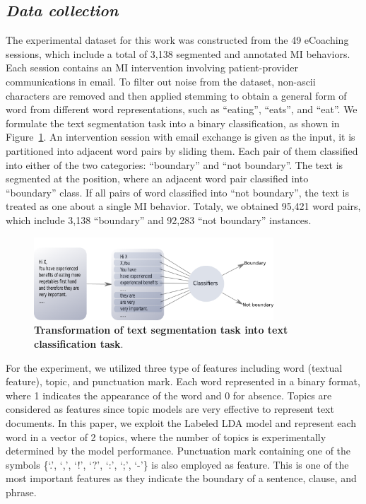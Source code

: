 \documentclass{amia}
\begin{document}
\subsection*{\textit{Data collection}}
The experimental dataset for this work was constructed from the 49 eCoaching sessions, which include a total of 3,138 segmented and annotated MI behaviors. Each session contains an MI intervention involving patient-provider communications in email. To filter out noise from the dataset, non-ascii characters are removed and then applied stemming to obtain a general form of word from different word representations, such as ``eating'', ``eats'', and ``eat''. We formulate the text segmentation task into a binary classification, as shown in Figure~\ref{fig:classifier}. An intervention session with email exchange is given as the input, it is partitioned into adjacent word pairs by sliding them. Each pair of them classified into either of the two categories: ``boundary'' and ``not boundary''. The text is segmented at the position, where an adjacent word pair classified into ``boundary'' class. If all pairs of word classified into ``not boundary'', the text is treated as one about a single MI behavior. Totaly, we obtained 95,421 word pairs, which include 3,138 ``boundary'' and 92,283 ``not boundary'' instances.    

\begin{figure}[!htb]
    \centering
    \includegraphics[width=0.80\textwidth]{figures/classifier.png}
    \caption{\textbf{Transformation of text segmentation task into text classification task}.}
    \label{fig:classifier}
\end{figure}


For the experiment, we utilized three type of features including word (textual feature), topic, and punctuation mark. Each word represented in a binary format, where 1 indicates the appearance of the word and 0 for absence. Topics are considered as features since topic models are very effective\cite{kotov2015interpretable,hashimoto2016topic,lu2016modeling} to represent text documents. In this paper, we exploit the Labeled LDA model\cite{kotov2015interpretable} and represent each word in a vector of 2 topics, where the number of topics is experimentally determined by the model performance. Punctuation mark containing one of the symbols \{`.', `,', `!', `?', `:', `;', `-'\} is also employed as feature. This is one of the most important features as they indicate the boundary of a sentence, clause, and phrase.   
\end{document}
